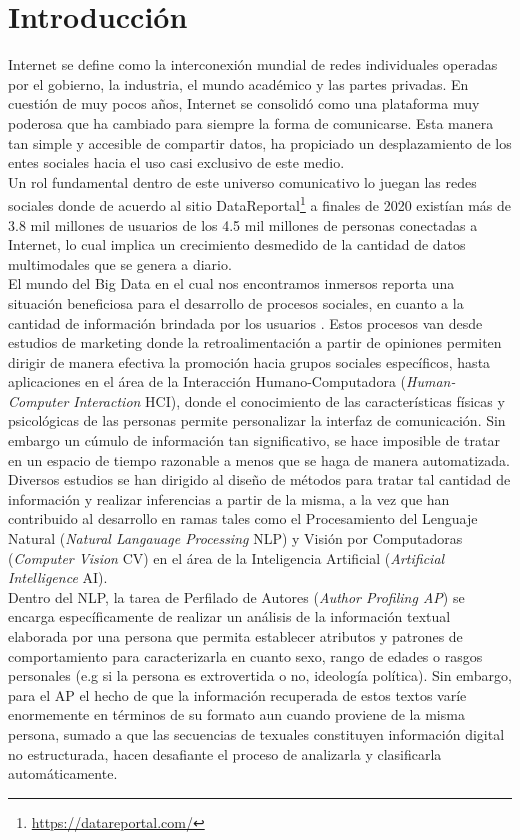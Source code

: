 \chapter*{Introducción}



Internet se define como la interconexión mundial de redes individuales operadas por el gobierno, la industria, el mundo académico y las partes privadas. En cuestión de muy pocos años, Internet se consolidó como una plataforma muy poderosa que ha cambiado para siempre la forma de comunicarse.  Esta manera tan simple y accesible de compartir datos, ha propiciado un desplazamiento de los entes sociales hacia el uso casi exclusivo de este medio.
\\
Un rol fundamental dentro de este universo comunicativo lo juegan las redes sociales donde de acuerdo al sitio DataReportal\footnote{\url{https://datareportal.com/}} a finales de 2020 existían más de 3.8 mil millones de usuarios de los 4.5 mil millones de personas conectadas a Internet, lo cual implica un crecimiento desmedido de la cantidad de datos multimodales que se genera a diario.
\\
El mundo del Big Data\citep{Riahi2018BigDA} en el cual nos encontramos inmersos reporta una situación beneficiosa para el desarrollo de procesos sociales, en cuanto a la cantidad de información brindada por los usuarios . 
Estos procesos van desde estudios de marketing donde la retroalimentación a partir de opiniones permiten dirigir de manera efectiva la promoción hacia grupos sociales específicos, hasta aplicaciones en el área de la Interacción Humano-Computadora (\textit{Human-Computer Interaction }HCI), donde el conocimiento de las características físicas y psicológicas de las personas permite personalizar la interfaz de comunicación. Sin embargo un cúmulo de información tan significativo, se hace imposible de tratar en un espacio de tiempo razonable a menos que se haga de manera automatizada.
\\
Diversos estudios se han dirigido al diseño de métodos para tratar tal cantidad de información y realizar inferencias a partir de la misma, a la vez que han contribuido al desarrollo en ramas tales como el Procesamiento del Lenguaje Natural (\textit{Natural Langauage Processing} NLP) y Visión por Computadoras (\textit{Computer Vision} CV) en el área de la Inteligencia Artificial (\textit{Artificial Intelligence} AI).
\\ 
Dentro del NLP, la tarea de Perfilado de Autores (\textit{Author Profiling AP}) \citep{Rosso2019,article} se encarga específicamente de realizar un análisis de la información textual elaborada por una persona que permita establecer atributos y patrones de comportamiento para caracterizarla en cuanto sexo, rango de edades o rasgos personales (e.g si la persona es extrovertida o no, ideología política). Sin embargo, para el AP el hecho de que la información recuperada de estos textos varíe enormemente en términos de su formato aun cuando proviene de la misma persona, sumado a que las secuencias de texuales constituyen información digital no estructurada, hacen desafiante el proceso de analizarla y clasificarla automáticamente. 

